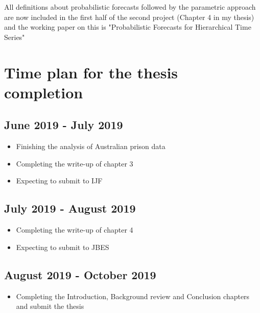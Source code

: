 All definitions about probabilistic forecasts followed by the parametric approach are now included in the first half of the second project (Chapter 4 in my thesis) and the working paper on this is "Probabilistic Forecasts for Hierarchical Time Series"

\pagebreak
\section{Time plan for the thesis completion}


\subsection*{June 2019 - July 2019}

\begin{itemize}
	\item Finishing the analysis of Australian prison data
	\item Completing the write-up of chapter 3
	\item Expecting to submit to IJF
\end{itemize}


\subsection*{July 2019 - August 2019}

\begin{itemize}
	\item Completing the write-up of chapter 4
	\item Expecting to submit to JBES
\end{itemize}


\subsection*{August 2019 - October 2019}

\begin{itemize}
	\item Completing the Introduction, Background review and Conclusion chapters and submit the thesis
\end{itemize}


